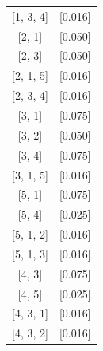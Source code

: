 \documentclass{beamer}
\begin{document}
\begin{frame}
\begin{minipage}{\textwidth}
\begin{minipage}[b]{0.49\textwidth}
{\begin{tabular}{|c|c|}
                            {[}1, 3, 4{]} & {[}0.016{]}         \\
                            {[}2, 1{]}    & {[}0.050{]}         \\
                            {[}2, 3{]}    & {[}0.050{]}         \\
                            {[}2, 1, 5{]} & {[}0.016{]}         \\
                            {[}2, 3, 4{]} & {[}0.016{]}         \\
                            {[}3, 1{]}    & {[}0.075{]}         \\
                            {[}3, 2{]}    & {[}0.050{]}         \\
                            {[}3, 4{]}    & {[}0.075{]}         \\
                            {[}3, 1, 5{]} & {[}0.016{]}         \\
                            {[}5, 1{]}    & {[}0.075{]}         \\
                            {[}5, 4{]}    & {[}0.025{]}         \\
                            {[}5, 1, 2{]} & {[}0.016{]}         \\
                            {[}5, 1, 3{]} & {[}0.016{]}         \\
                            {[}4, 3{]}    & {[}0.075{]}         \\
                            {[}4, 5{]}    & {[}0.025{]}         \\
                            {[}4, 3, 1{]} & {[}0.016{]}         \\
                            {[}4, 3, 2{]} & {[}0.016{]}         \\ \hline
                        \end{tabular}
                    }
                \end{minipage}
            \end{minipage}
        \end{frame}
\end{document}
